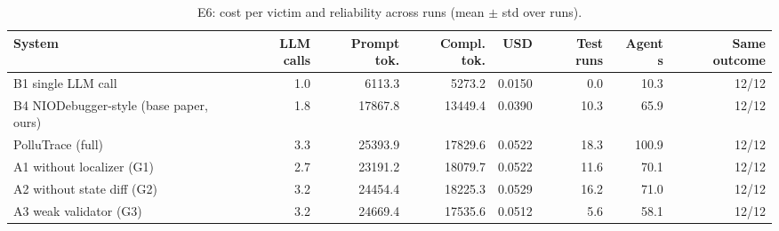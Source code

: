 \begin{table}[t]
\centering
\footnotesize
\caption{E6: cost per victim and reliability across runs (mean $\pm$ std over runs).}
\label{tab:eff}
\begin{tabular}{lrrrrrrr}
\toprule
\textbf{System} & \textbf{LLM calls} & \textbf{Prompt tok.} & \textbf{Compl. tok.} & \textbf{USD} & \textbf{Test runs} & \textbf{Agent s} & \textbf{Same outcome} \\
\midrule
B1 single LLM call & 1.0 & 6113.3 & 5273.2 & 0.0150 & 0.0 & 10.3 & 12/12 \\
B4 NIODebugger-style (base paper, ours) & 1.8 & 17867.8 & 13449.4 & 0.0390 & 10.3 & 65.9 & 12/12 \\
PolluTrace (full) & 3.3 & 25393.9 & 17829.6 & 0.0522 & 18.3 & 100.9 & 12/12 \\
A1 without localizer (G1) & 2.7 & 23191.2 & 18079.7 & 0.0522 & 11.6 & 70.1 & 12/12 \\
A2 without state diff (G2) & 3.2 & 24454.4 & 18225.3 & 0.0529 & 16.2 & 71.0 & 12/12 \\
A3 weak validator (G3) & 3.2 & 24669.4 & 17535.6 & 0.0512 & 5.6 & 58.1 & 12/12 \\
\bottomrule
\end{tabular}
\end{table}

